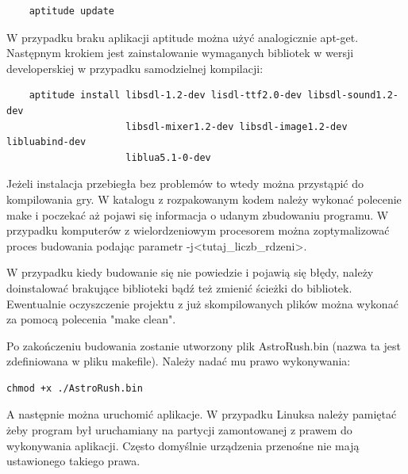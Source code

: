 \begin{verbatim}
	aptitude update
\end{verbatim}

W przypadku braku aplikacji aptitude można użyć analogicznie apt-get. Następnym krokiem jest zainstalowanie wymaganych bibliotek w wersji developerskiej w przypadku samodzielnej kompilacji:
\begin{verbatim}
	aptitude install libsdl-1.2-dev lisdl-ttf2.0-dev libsdl-sound1.2-dev 
					 libsdl-mixer1.2-dev libsdl-image1.2-dev libluabind-dev 
					 liblua5.1-0-dev
\end{verbatim}

Jeżeli instalacja przebiegła bez problemów to wtedy można przystąpić do kompilowania gry.
W katalogu z rozpakowanym kodem należy wykonać polecenie make i poczekać aż pojawi się informacja o udanym zbudowaniu programu. W przypadku komputerów z wielordzeniowym procesorem można zoptymalizować proces budowania podając parametr -j<tutaj\_liczb\_rdzeni>.

W przypadku kiedy budowanie się nie powiedzie i pojawią się błędy, należy doinstalować brakujące biblioteki bądź też zmienić ścieżki do bibliotek. Ewentualnie oczyszczenie projektu z już skompilowanych plików można wykonać za pomocą polecenia "make clean". 

Po zakończeniu budowania zostanie utworzony plik AstroRush.bin (nazwa ta jest zdefiniowana w pliku makefile). Należy nadać mu prawo wykonywania:
\begin{verbatim}
chmod +x ./AstroRush.bin
\end{verbatim}

A następnie można uruchomić aplikacje. W przypadku Linuksa należy pamiętać żeby program był uruchamiany na partycji zamontowanej z prawem do wykonywania aplikacji. Często domyślnie urządzenia przenośne nie mają ustawionego takiego prawa. 